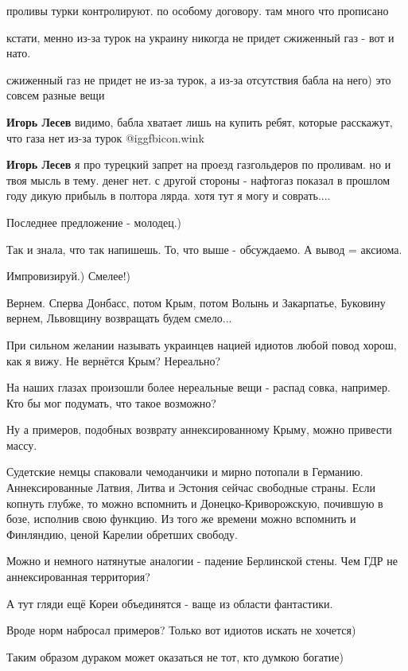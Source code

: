 \begin{itemize}
\begin{itemize}
проливы турки контролируют. по особому договору. там много что прописано

кстати, менно из-за турок на украину никогда не придет сжиженный газ - вот и нато.

сжиженный газ не придет не из-за турок, а из-за отсутствия бабла на него) это совсем разные вещи

\textbf{Игорь Лесев} видимо, бабла хватает лишь на купить ребят, которые расскажут, что газа нет из-за турок  @igg{fbicon.wink} 

\textbf{Игорь Лесев} я про турецкий запрет на проезд газгольдеров по проливам. но и твоя мысль в тему. денег нет. с другой стороны - нафтогаз показал в прошлом году дикую прибыль в полтора лярда. хотя тут я могу и соврать....

\end{itemize} %

Последнее предложение - молодец.)

\begin{itemize} %
Так и знала, что так напишешь. То, что выше - обсуждаемо. А вывод = аксиома.

Импровизируй.) Смелее!)
\end{itemize} %

Вернем. Сперва Донбасс, потом Крым, потом Волынь и Закарпатье, Буковину вернем, Львовщину возвращать будем смело...


При сильном желании называть украинцев нацией идиотов любой повод хорош, как я
вижу. Не вернётся Крым? Нереально?

На наших глазах произошли более нереальные вещи - распад совка, например. Кто
бы мог подумать, что такое возможно?

Ну а примеров, подобных возврату аннексированному Крыму, можно привести массу.

Судетские немцы спаковали чемоданчики и мирно потопали в Германию.
Аннексированные Латвия, Литва и Эстония сейчас свободные страны. Если копнуть
глубже, то можно вспомнить и Донецко-Криворожскую, почившую в бозе, исполнив
свою функцию. Из того же времени можно вспомнить и Финляндию, ценой Карелии
обретших свободу.

Можно и немного натянутые аналогии - падение Берлинской стены. Чем ГДР не
аннексированная территория?

А тут гляди ещё Кореи объединятся - ваще из области фантастики.

Вроде норм набросал примеров? Только вот идиотов искать не хочется)

Таким образом дураком может оказаться не тот, кто думкою богатие)

\end{itemize} %
